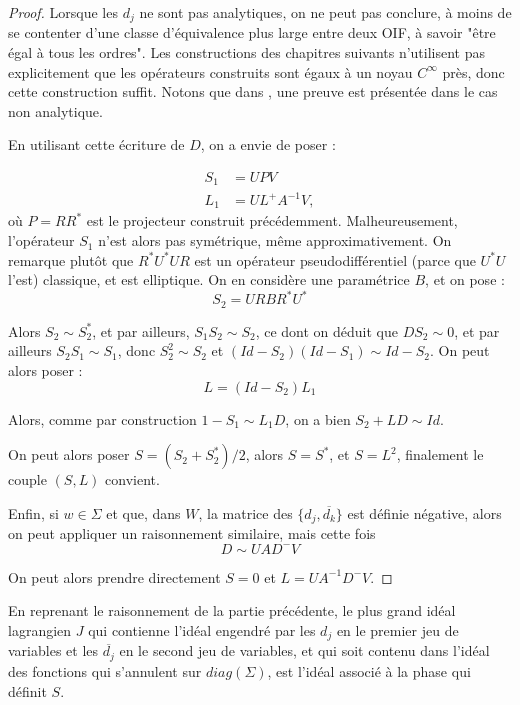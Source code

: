 \begin{proof}
  Lorsque les $d_j$ ne sont pas analytiques, on ne peut pas conclure, à moins de se contenter d'une classe d'équivalence plus large entre deux OIF, à savoir "être égal à tous les ordres". Les constructions des chapitres suivants n'utilisent pas explicitement que les opérateurs construits sont égaux à un noyau $C^{\infty}$ près, donc cette construction suffit. Notons que dans \cite{BoutetdeMonvel1974-1975}, une preuve est présentée dans le cas non analytique.
  
  En utilisant cette écriture de $D$, on a envie de poser :
  
  \begin{align*}
    S_1 &= UPV\\
    L_1 &= UL^+A^{-1}V,
  \end{align*}
où $P=RR^*$ est le projecteur construit précédemment. Malheureusement, l'opérateur $S_1$ n'est alors pas symétrique, même approximativement. On remarque plutôt que $R^*U^*UR$ est un opérateur pseudodifférentiel (parce que $U^*U$ l'est) classique, et est elliptique. On en considère une paramétrice $B$, et on pose :
  \begin{equation*}
    S_2=URBR^*U^*
  \end{equation*}
  
  Alors $S_2 \sim S_2^*$, et par ailleurs, $S_1S_2 \sim S_2$, ce dont on déduit que $DS_2 \sim 0$, et par ailleurs $S_2S_1 \sim S_1$, donc $S_2^2 \sim S_2$ et $(Id-S_2)(Id-S_1) \sim Id-S_2$. On peut alors poser :
  \begin{equation*}
    L=(Id-S_2)L_1
  \end{equation*}
  
  Alors, comme par construction $1-S_1 \sim L_1D$, on a bien $S_2 + LD \sim Id$.
  
  On peut alors poser $S=(S_2+S_2^*)/2$, alors $S=S^*$, et $S=L^2$, finalement le couple $(S,L)$ convient.
  
  Enfin, si $w \in \Sigma$ et que, dans $W$, la matrice des $\{d_j,\overline{d_k}\}$ est définie négative, alors on peut appliquer un raisonnement similaire, mais cette fois
  \begin{equation*}
    D \sim UAD^-V
  \end{equation*}
  
  On peut alors prendre directement $S=0$ et $L=UA^{-1}D^-V$.
  \end{proof}
  
  En reprenant le raisonnement de la partie précédente, le plus grand idéal lagrangien $J$ qui contienne l'idéal engendré par les $d_j$ en le premier jeu de variables et les $\overline{d_j}$ en le second jeu de variables, et qui soit contenu dans l'idéal des fonctions qui s'annulent sur $diag(\Sigma)$, est l'idéal associé à la phase qui définit $S$.
